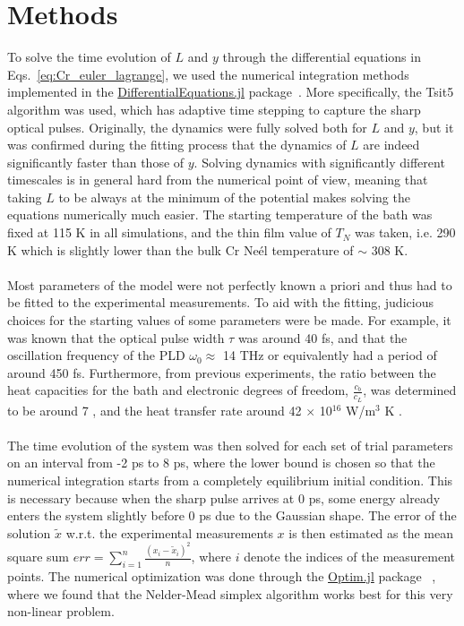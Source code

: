 \section{Methods \label{sec:Cr_Methods}}
To solve the time evolution of $L$ and $y$ through the differential equations in Eqs.~\ref{eq:Cr_euler_lagrange}, we used the numerical integration methods implemented in the \href{https://github.com/SciML/DifferentialEquations.jl}{DifferentialEquations.jl} package~\cite{rackauckas2017differentialequations}. More specifically, the Tsit5 algorithm was used, which has adaptive time stepping to capture the sharp optical pulses.
Originally, the dynamics were fully solved both for $L$ and $y$, but it was confirmed during the fitting process that the dynamics of $L$ are indeed significantly faster than those of $y$.
Solving dynamics with significantly different timescales is in general hard from the numerical point of view, meaning that taking $L$ to be always at the minimum of the potential makes solving the equations numerically much easier.
The starting temperature of the bath was fixed at 115 K in all simulations, and the thin film value of $T_N$ was taken, i.e. 290 K which is slightly lower than the bulk Cr Ne\'el temperature of $\sim$ 308 K.
\\\\
Most parameters of the model were not perfectly known a priori and thus had to be fitted to the experimental measurements.
To aid with the fitting, judicious choices for the starting values of some parameters were be made.
For example, it was known that the optical pulse width $\tau$ was around 40 fs, and that the oscillation frequency of the PLD $\omega_0 \approx$ 14 THz or equivalently had a period of around 450 fs.
Furthermore, from previous experiments, the ratio between the heat capacities for the bath and electronic degrees of freedom, $\frac{c_b}{c_L}$, was determined to be around 7 \cite{Nicholson2016}, and the heat transfer rate around 42 $\times$ 10$^{16}$ W/m$^3$ K \cite{Hostetler1999}.
\\\\
The time evolution of the system was then solved for each set of trial parameters on an interval from -2 ps to 8 ps, where the lower bound is chosen so that the numerical integration starts from a completely equilibrium initial condition.
This is necessary because when the sharp pulse arrives at 0 ps, some energy already enters the system slightly before 0 ps due to the Gaussian shape.
The error of the solution $\tilde{x}$ w.r.t. the experimental measurements $x$ is then estimated as the mean square sum $err = \sum_{i=1}^n \frac{(x_i - \tilde{x}_i)^2}{n}$, where $i$ denote the indices of the measurement points.
The numerical optimization was done through the \href{https://github.com/JuliaNLSolvers/Optim.jl}{Optim.jl} package ~\cite{mogensen2018optim}, where we found that the Nelder-Mead simplex algorithm \cite{Nelder1965} works best for this very non-linear problem.

